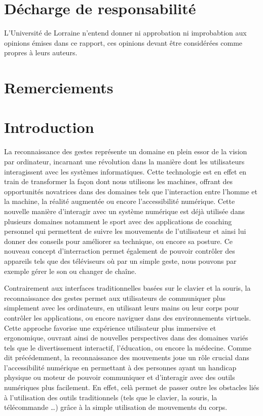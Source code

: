 \documentclass[11pt]{article}
\begin{document}
\newpage \newpage
\section*{Décharge de responsabilité }\bigbreak
L'Université de Lorraine n'entend donner ni approbation  ni improbabtion aux opinions émises dans ce rapport,
ces opinions devant être considérées comme propres à leurs auteurs. \bigbreak

\newpage
\section*{Remerciements}

\newpage
\tableofcontents
\newpage

\setcounter{page}{1}
\section*{Introduction}
La reconnaissance des gestes représente un domaine en plein essor de la vision par ordinateur, incarnant une révolution dans la manière dont les utilisateurs interagissent avec les systèmes informatiques. Cette technologie est en effet en train de transformer la façon dont nous utilisons les machines,
offrant des opportunités novatrices dans des domaines tels que l'interaction entre l'homme et la machine, 
la réalité augmentée ou encore l'accessibilité numérique.
Cette nouvelle manière d'interagir avec un système numérique est déjà utilisée dans plusieurs domaines notamment le sport avec des applications de coaching personnel qui permettent de suivre les mouvements de l'utilisateur et ainsi lui donner des conseils pour améliorer sa technique, ou encore sa posture. Ce nouveau concept d'interraction permet également de pouvoir contrôler des appareils tels que des téléviseurs où par un simple geste, nous pouvons par exemple gérer le son ou changer de chaîne. \bigbreak

Contrairement aux interfaces traditionnelles basées sur le clavier et la souris, la reconnaissance des gestes permet aux utilisateurs de communiquer plus simplement avec les ordinateurs, en utilisant leurs mains ou leur corps pour contrôler les applications, ou encore naviguer dans des environnements virtuels. Cette approche favorise une expérience utilisateur plus immersive et ergonomique, ouvrant ainsi de nouvelles perspectives dans des domaines variés tels que le divertissement interactif, l'éducation, ou encore la médecine. Comme dit précédemment, la reconnaissance des mouvements joue un rôle crucial dans l’accessibilité numérique en permettant à des personnes ayant un handicap physique  ou moteur de pouvoir communiquer et d'interagir avec des outils numériques plus facilement. En effet, celà permet de passer outre les obstacles liés à l’utilisation des outils traditionnels (tels que le clavier, la souris, la télécommande …) grâce à la simple utilisation de mouvements du corps. \bigbreak
\end{document}
